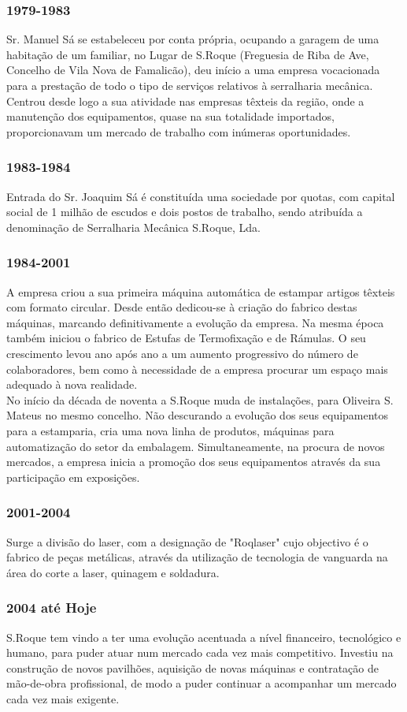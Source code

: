 \begin{frame}
\frametitle{1979-1983}
Sr. Manuel Sá se estabeleceu por conta própria, ocupando a garagem de uma habitação de um familiar, no Lugar de S.Roque (Freguesia de Riba de Ave, Concelho de Vila Nova de Famalicão), deu início a uma empresa vocacionada para a prestação de todo o tipo de serviços relativos à serralharia mecânica. Centrou desde logo a sua atividade nas empresas têxteis da região, onde a manutenção dos equipamentos, quase na sua totalidade importados, proporcionavam um mercado de trabalho com inúmeras oportunidades.
\end{frame}

\begin{frame}
\frametitle{1983-1984}
Entrada do Sr. Joaquim Sá é constituída uma sociedade por quotas, com capital social de 1 milhão de escudos e dois postos de trabalho, sendo atribuída a denominação de Serralharia Mecânica S.Roque, Lda.
\end{frame}

\begin{frame}
\frametitle{1984-2001}
A empresa criou a sua primeira máquina automática de estampar artigos têxteis com formato circular. Desde então dedicou-se à criação do fabrico destas máquinas, marcando definitivamente a evolução da empresa. Na mesma época também iniciou o fabrico de Estufas de Termofixação e de Rámulas. O seu crescimento levou ano após ano a um aumento progressivo do número de colaboradores, bem como à necessidade de a empresa procurar um espaço mais adequado à nova realidade.\\
No início da década de noventa a S.Roque muda de instalações, para Oliveira S. Mateus no mesmo concelho. Não descurando a evolução dos seus equipamentos para a estamparia, cria uma nova linha de produtos, máquinas para automatização do setor da embalagem. Simultaneamente, na procura de novos mercados, a empresa inicia a promoção dos seus equipamentos através da sua participação em exposições.
\end{frame}

\begin{frame}
\frametitle{2001-2004}
Surge a divisão do laser, com a designação de "Roqlaser" cujo objectivo é o fabrico de peças metálicas, através da utilização de tecnologia de vanguarda na área do corte a laser, quinagem e soldadura.
\end{frame}

\begin{frame}
\frametitle{2004 até Hoje}
S.Roque tem vindo a ter uma evolução acentuada a nível financeiro, tecnológico e humano, para puder atuar num mercado cada vez mais competitivo. Investiu na construção de novos pavilhões, aquisição de novas máquinas e contratação de mão-de-obra profissional, de modo a puder continuar a acompanhar um mercado cada vez mais exigente.
\end{frame}

